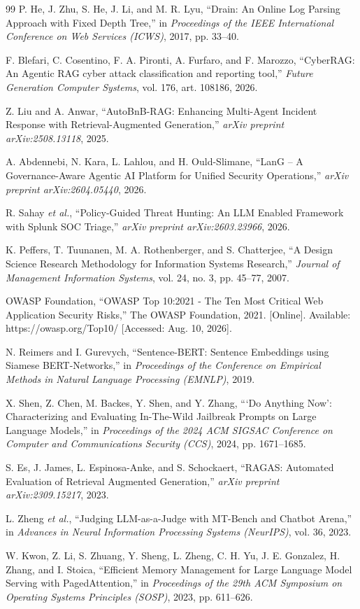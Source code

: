 \documentclass[12pt,a4paper]{report}
\begin{document}
\begin{thebibliography}{99}
P. He, J. Zhu, S. He, J. Li, and M. R. Lyu, ``Drain: An Online Log Parsing Approach with Fixed Depth Tree,'' in \textit{Proceedings of the IEEE International Conference on Web Services (ICWS)}, 2017, pp. 33--40.

F. Blefari, C. Cosentino, F. A. Pironti, A. Furfaro, and F. Marozzo, ``CyberRAG: An Agentic RAG cyber attack classification and reporting tool,'' \textit{Future Generation Computer Systems}, vol. 176, art. 108186, 2026.

Z. Liu and A. Anwar, ``AutoBnB-RAG: Enhancing Multi-Agent Incident Response with Retrieval-Augmented Generation,'' \textit{arXiv preprint arXiv:2508.13118}, 2025.

A. Abdennebi, N. Kara, L. Lahlou, and H. Ould-Slimane, ``LanG -- A Governance-Aware Agentic AI Platform for Unified Security Operations,'' \textit{arXiv preprint arXiv:2604.05440}, 2026.

R. Sahay \textit{et al.}, ``Policy-Guided Threat Hunting: An LLM Enabled Framework with Splunk SOC Triage,'' \textit{arXiv preprint arXiv:2603.23966}, 2026.

K. Peffers, T. Tuunanen, M. A. Rothenberger, and S. Chatterjee, ``A Design Science Research Methodology for Information Systems Research,'' \textit{Journal of Management Information Systems}, vol. 24, no. 3, pp. 45--77, 2007.

OWASP Foundation, ``OWASP Top 10:2021 - The Ten Most Critical Web Application Security Risks,'' The OWASP Foundation, 2021. [Online]. Available: https://owasp.org/Top10/ [Accessed: Aug. 10, 2026].

N. Reimers and I. Gurevych, ``Sentence-BERT: Sentence Embeddings using Siamese BERT-Networks,'' in \textit{Proceedings of the Conference on Empirical Methods in Natural Language Processing (EMNLP)}, 2019.

X. Shen, Z. Chen, M. Backes, Y. Shen, and Y. Zhang, ```Do Anything Now': Characterizing and Evaluating In-The-Wild Jailbreak Prompts on Large Language Models,'' in \textit{Proceedings of the 2024 ACM SIGSAC Conference on Computer and Communications Security (CCS)}, 2024, pp. 1671--1685.

S. Es, J. James, L. Espinosa-Anke, and S. Schockaert, ``RAGAS: Automated Evaluation of Retrieval Augmented Generation,'' \textit{arXiv preprint arXiv:2309.15217}, 2023.

L. Zheng \textit{et al.}, ``Judging LLM-as-a-Judge with MT-Bench and Chatbot Arena,'' in \textit{Advances in Neural Information Processing Systems (NeurIPS)}, vol. 36, 2023.

W. Kwon, Z. Li, S. Zhuang, Y. Sheng, L. Zheng, C. H. Yu, J. E. Gonzalez, H. Zhang, and I. Stoica, ``Efficient Memory Management for Large Language Model Serving with PagedAttention,'' in \textit{Proceedings of the 29th ACM Symposium on Operating Systems Principles (SOSP)}, 2023, pp. 611--626.
\end{thebibliography}
\end{document}
